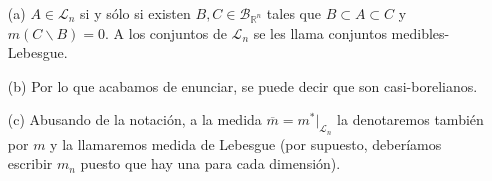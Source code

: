 \begin{obs}
\begin{enumerate}
    \item[(a)] $A \in \mathcal{L}_n$ si y sólo si existen $B, C \in \mathcal{B}_{\mathbb{R}^n}$ tales que $B \subset A \subset C$ y $m(C \backslash B) = 0$. A los conjuntos de $\mathcal{L}_n$ se les llama conjuntos medibles-Lebesgue.
    \item[(b)] Por lo que acabamos de enunciar, se puede decir que son casi-borelianos.
    \item[(c)] Abusando de la notación, a la medida $\overline{m} = m^*|_{\mathcal{L}_n}$ la denotaremos también por $m$ y la llamaremos medida de Lebesgue (por supuesto, deberíamos escribir $m_n$ puesto que hay una para cada dimensión).
\end{enumerate}
\end{obs}